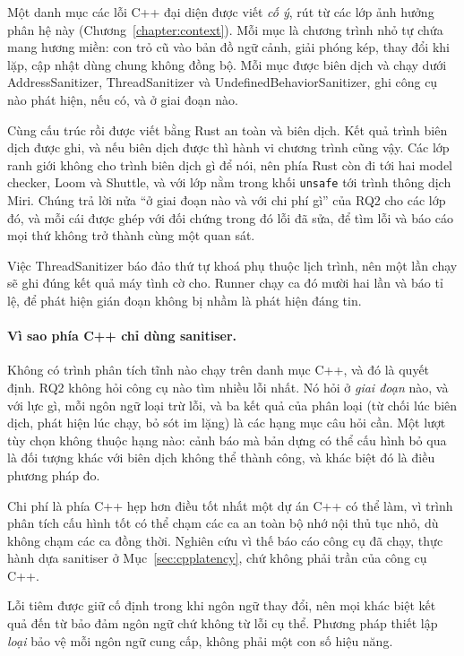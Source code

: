 Một danh mục các lỗi C++ đại diện được viết \emph{cố ý}, rút từ các lớp ảnh hưởng phân hệ này
(Chương~\ref{chapter:context}). Mỗi mục là chương trình nhỏ tự chứa mang hương miền: con trỏ cũ
vào bản đồ ngữ cảnh, giải phóng kép, thay đổi khi lặp, cập nhật dùng chung không đồng bộ. Mỗi mục
được biên dịch và chạy dưới AddressSanitizer, ThreadSanitizer và UndefinedBehaviorSanitizer, ghi
công cụ nào phát hiện, nếu có, và ở giai đoạn nào.

Cùng cấu trúc rồi được viết bằng Rust an toàn và biên dịch. Kết quả trình biên dịch được ghi, và
nếu biên dịch được thì hành vi chương trình cũng vậy. Các lớp ranh giới không cho trình biên dịch
gì để nói, nên phía Rust còn đi tới hai model checker, Loom và Shuttle, và với lớp nằm trong khối
\texttt{unsafe} tới trình thông dịch Miri. Chúng trả lời nửa ``ở giai đoạn nào và với chi phí gì''
của RQ2 cho các lớp đó, và mỗi cái được ghép với đối chứng trong đó lỗi đã sửa, để tìm lỗi và
báo cáo mọi thứ không trở thành cùng một quan sát.

Việc ThreadSanitizer báo đảo thứ tự khoá phụ thuộc lịch trình, nên một lần chạy sẽ ghi đúng kết
quả máy tình cờ cho. Runner chạy ca đó mười hai lần và báo tỉ lệ, để phát hiện gián đoạn không bị
nhầm là phát hiện đáng tin.

\paragraph{Vì sao phía C++ chỉ dùng sanitiser.}
Không có trình phân tích tĩnh nào chạy trên danh mục C++, và đó là quyết định. RQ2 không hỏi công
cụ nào tìm nhiều lỗi nhất. Nó hỏi ở \emph{giai đoạn} nào, và với lực gì, mỗi ngôn ngữ loại trừ
lỗi, và ba kết quả của phân loại (từ chối lúc biên dịch, phát hiện lúc chạy, bỏ sót im lặng) là
các hạng mục câu hỏi cần. Một lượt tùy chọn không thuộc hạng nào: cảnh báo mà bản dựng có thể cấu
hình bỏ qua là đối tượng khác với biên dịch không thể thành công, và khác biệt đó là điều phương
pháp đo.

Chi phí là phía C++ hẹp hơn điều tốt nhất một dự án C++ có thể làm, vì trình phân tích cấu hình
tốt có thể chạm các ca an toàn bộ nhớ nội thủ tục nhỏ, dù không chạm các ca đồng thời. Nghiên cứu
vì thế báo cáo công cụ đã chạy, thực hành dựa sanitiser ở Mục~\ref{sec:cpplatency}, chứ không phải
trần của công cụ C++.

Lỗi tiêm được giữ cố định trong khi ngôn ngữ thay đổi, nên mọi khác biệt kết quả đến từ bảo đảm
ngôn ngữ chứ không từ lỗi cụ thể. Phương pháp thiết lập \emph{loại} bảo vệ mỗi ngôn ngữ cung cấp,
không phải một con số hiệu năng.

